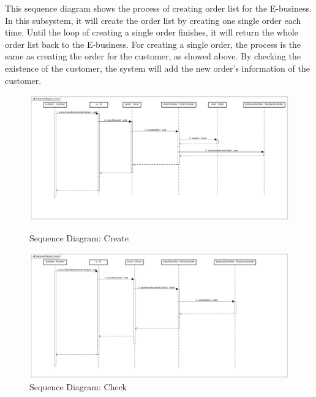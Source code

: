 \documentclass[12pt]{scrreprt}
\begin{document}
This sequence diagram shows the process of creating order list for the E-business. In this subsystem, it will create the order list by creating one single order each time. Until the loop of creating a single order finishes, it will return the whole order list back to the E-business. For creating a single order, the process is the same as creating the order for the customer, as showed above. By checking the existence of the customer, the system will add the new order’s information of the customer.
\begin{figure}[htbp]
	\centering\includegraphics[width=6in]{DocumentRes/1SequenceDiagram_create.png}
	\caption{Sequence Diagram: Create}
	\centering\includegraphics[width=6in]{DocumentRes/2SequenceDiagram_check.png}
	\caption{Sequence Diagram: Check}
\end{figure}
\end{document}
